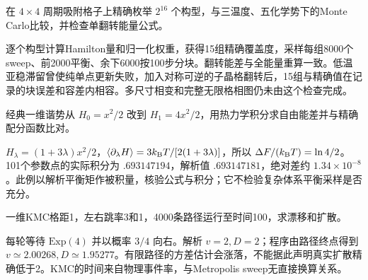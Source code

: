 \begin{exercise}
在 $4\times4$ 周期吸附格子上精确枚举 $2^{16}$ 个构型，与三温度、五化学势下的Monte Carlo比较，并检查单翻转能量公式。
\end{exercise}
\begin{solution}
逐个构型计算Hamilton量和归一化权重，获得15组精确覆盖度，采样每组8000个sweep、前2000平衡、余下6000按100步分块。翻转能差与全能量重算一致。低温亚稳滞留曾使纯单点更新失败，加入对称可逆的子晶格翻转后，15组与精确值在记录的块误差和容差内相容。多尺寸相变和完整无限格相图仍未由这个检查完成。
\end{solution}
\begin{exercise}
经典一维谐势从 $H_0=x^2/2$ 改到 $H_1=4x^2/2$，用热力学积分求自由能差并与精确配分函数比对。
\end{exercise}
\begin{solution}
$H_\lambda=(1+3\lambda)x^2/2$，$\langle \partial_\lambda H\rangle=3k_{\mathrm B} T/[2(1+3\lambda)]$，所以 $\Delta F/(k_{\mathrm B} T)=\ln4/2$。101个参数点的实际积分为 $.693147194$，解析值 $.693147181$，绝对差约 $1.34\times10^{-8}$。此例以解析平衡矩作被积量，核验公式与积分；它不检验复杂体系平衡采样是否充分。
\end{solution}
\begin{exercise}
一维KMC格距1，左右跳率3和1，4000条路径运行至时间100，求漂移和扩散。
\end{exercise}
\begin{solution}
每轮等待 $\mathrm{Exp}(4)$ 并以概率 $3/4$ 向右。解析 $v=2,D=2$；程序由路径终点得到 $v\simeq2.00268,D\simeq1.95277$。有限路径的方差估计会涨落，不能据此声明真实扩散精确低于2。KMC的时间来自物理事件率，与Metropolis sweep无直接换算关系。
\end{solution}
